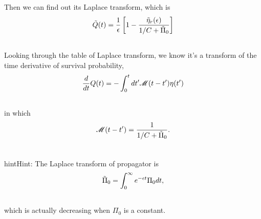 \documentclass[letterpaper,10pt,english]{sphinxmanual}
\begin{document}
Then we can find out its Laplace transform, which is
\begin{gather}
\begin{split}\tilde Q(t) = \frac{1}{\epsilon} \left[ 1 - \frac{\tilde \eta_r(\epsilon)}{1/C + \tilde \Pi_0} \right]\end{split}\notag\\\begin{split}\end{split}\notag
\end{gather}
Looking through the table of Laplace transform, we know it's a transform of the time derivative of survival probability,
\begin{gather}
\begin{split}\frac{d}{dt}Q(t) = - \int_0^t dt' \mathscr M(t-t') \eta(t')\end{split}\notag\\\begin{split}\end{split}\notag
\end{gather}
in which
\begin{gather}
\begin{split}\mathscr M(t-t') = \frac{1}{1/C + \tilde \Pi_0} .\end{split}\notag\\\begin{split}\end{split}\notag
\end{gather}
\begin{notice}{hint}{Hint:}
The Laplace transform of propagator is
\begin{gather}
\begin{split}\tilde \Pi_0 = \int_0^\infty e^{-\epsilon t} \Pi_0 dt,\end{split}\notag\\\begin{split}\end{split}\notag
\end{gather}
which is actually decreasing when $\Pi_0$ is a constant.
\end{notice}
\end{document}
